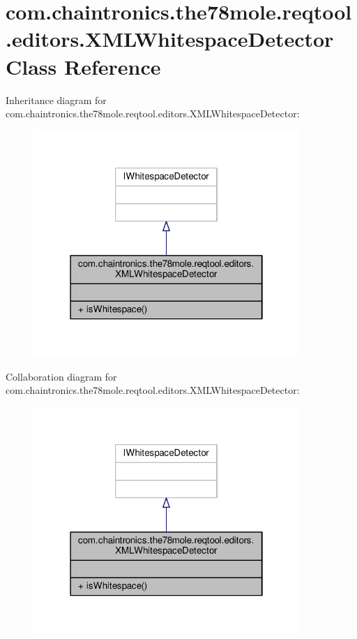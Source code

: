 \hypertarget{classcom_1_1chaintronics_1_1the78mole_1_1reqtool_1_1editors_1_1XMLWhitespaceDetector}{}\section{com.\+chaintronics.\+the78mole.\+reqtool.\+editors.\+X\+M\+L\+Whitespace\+Detector Class Reference}
\label{classcom_1_1chaintronics_1_1the78mole_1_1reqtool_1_1editors_1_1XMLWhitespaceDetector}


Inheritance diagram for com.\+chaintronics.\+the78mole.\+reqtool.\+editors.\+X\+M\+L\+Whitespace\+Detector\+:\nopagebreak
\begin{figure}[H]
\begin{center}
\leavevmode
\includegraphics[width=286pt]{d0/de4/classcom_1_1chaintronics_1_1the78mole_1_1reqtool_1_1editors_1_1XMLWhitespaceDetector__inherit__graph}
\end{center}
\end{figure}


Collaboration diagram for com.\+chaintronics.\+the78mole.\+reqtool.\+editors.\+X\+M\+L\+Whitespace\+Detector\+:\nopagebreak
\begin{figure}[H]
\begin{center}
\leavevmode
\includegraphics[width=286pt]{d9/d74/classcom_1_1chaintronics_1_1the78mole_1_1reqtool_1_1editors_1_1XMLWhitespaceDetector__coll__graph}
\end{center}
\end{figure}
